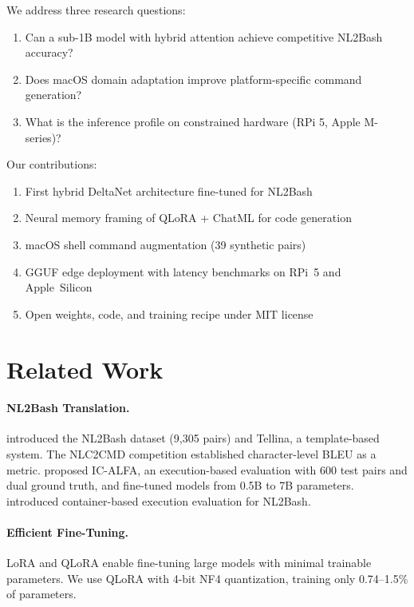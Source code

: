 \documentclass[11pt,a4paper]{article}
\begin{document}
We address three research questions:
\begin{enumerate}
    \item[\textbf{RQ1}] Can a sub-1B model with hybrid attention achieve competitive NL2Bash accuracy?
    \item[\textbf{RQ2}] Does macOS domain adaptation improve platform-specific command generation?
    \item[\textbf{RQ3}] What is the inference profile on constrained hardware (RPi 5, Apple M-series)?
\end{enumerate}

\noindent Our contributions:
\begin{enumerate}
    \item First hybrid DeltaNet architecture fine-tuned for NL2Bash
    \item Neural memory framing of QLoRA + ChatML for code generation
    \item macOS shell command augmentation (39 synthetic pairs)
    \item GGUF edge deployment with latency benchmarks on RPi~5 and Apple~Silicon
    \item Open weights, code, and training recipe under MIT license
\end{enumerate}

\section{Related Work}

\paragraph{NL2Bash Translation.}
\citet{lin2018} introduced the NL2Bash dataset (9{,}305 pairs) and Tellina, a template-based system.
The NLC2CMD competition \cite{agarwal2021} established character-level BLEU as a metric.
\citet{westenfelder2025} proposed IC-ALFA, an execution-based evaluation with 600 test pairs and dual ground truth, and fine-tuned models from 0.5B to 7B parameters.
\citet{vo2024} introduced container-based execution evaluation for NL2Bash.

\paragraph{Efficient Fine-Tuning.}
LoRA \cite{hu2021} and QLoRA \cite{dettmers2023} enable fine-tuning large models with minimal trainable parameters.
We use QLoRA with 4-bit NF4 quantization, training only 0.74--1.5\% of parameters.
\end{document}
